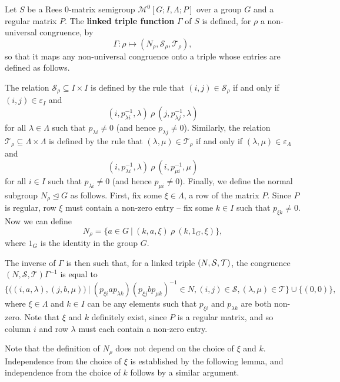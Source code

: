 \begin{definition}
  \label{def:linked-triple-function}
  Let $S$ be a Rees 0-matrix semigroup $\mathcal{M}^0[G;I,\Lambda;P]$ over a
  group $G$ and a regular matrix $P$.
  The \textbf{linked triple function} $\Gamma$ of $S$ is defined, for $\rho$ a
  non-universal congruence, by
  $$\Gamma: \rho \mapsto (N_\rho, \mathcal{S}_\rho, \mathcal{T}_\rho),$$
  so that it maps any non-universal congruence onto a triple whose entries are
  defined as follows.

  The relation $\mathcal{S}_\rho \subseteq I \times I$ is defined by the rule that
  $(i,j) \in \mathcal{S}_\rho$ if and only if $(i,j) \in \varepsilon_I$ and
  $$(i, p_{\lambda i}^{-1}, \lambda) ~\rho~ (j, p_{\lambda j}^{-1}, \lambda)$$
  for all $\lambda \in \Lambda$ such that $p_{\lambda i} \neq 0$ (and hence
  $p_{\lambda j} \neq 0$).  Similarly, the relation
  $\mathcal{T}_\rho \subseteq \Lambda \times \Lambda$ is defined by the rule that
  $(\lambda,\mu) \in \mathcal{T}_\rho$ if and only if
  $(\lambda,\mu) \in \varepsilon_\Lambda$ and
  $$(i, p_{\lambda i}^{-1}, \lambda) ~\rho~ (i, p_{\mu i}^{-1}, \mu)$$
  for all $i \in I$ such that $p_{\lambda i} \neq 0$ (and hence
  $p_{\mu i} \neq 0$).  Finally, we define the normal subgroup
  $N_\rho \trianglelefteq G$ as follows.  First, fix some $\xi \in \Lambda$, a
  row of the matrix $P$.  Since $P$ is regular, row $\xi$ must contain a
  non-zero entry -- fix some $k \in I$ such that $p_{\xi k} \neq 0$.  Now we can
  define
  $$N_\rho = \{a \in G ~|~ (k, a, \xi) ~\rho~ (k, 1_G, \xi)\},$$
  where $1_G$ is the identity in the group $G$.

  The inverse of $\Gamma$ is then such that, for a linked triple $(N, \mathcal{S}, \mathcal{T})$,
  the congruence $(N, \mathcal{S}, \mathcal{T})\Gamma^{-1}$ is equal to
  $$\Big\{
  \big((i, a, \lambda), (j, b, \mu)\big) ~\Big|~
  (p_{\xi i} a p_{\lambda k}) (p_{\xi j} b p_{\mu k})^{-1} \in N,
  (i,j) \in \mathcal{S},
  (\lambda,\mu) \in \mathcal{T}
  \Big\}
  \cup \big\{(0,0)\big\},$$
  where $\xi \in \Lambda$ and $k \in I$ can be any elements such that
  $p_{\xi i}$ and $p_{\lambda k}$ are both non-zero.
  Note that $\xi$ and $k$ definitely exist, since $P$ is a regular matrix, and
  so column $i$ and row $\lambda$ must each contain a non-zero entry.
\end{definition}

Note that the definition of $N_\rho$ does not depend on the choice of $\xi$ and
$k$.  Independence from the choice of $\xi$ is established by the following
lemma, and independence from the choice of $k$ follows by a similar argument.


